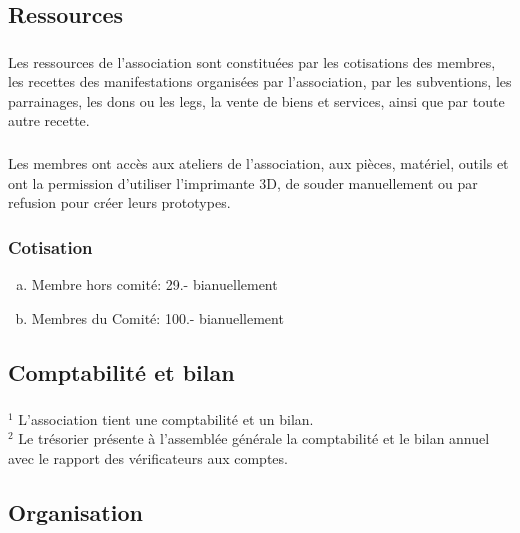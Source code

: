 \documentclass[12pt,a4paper,oneside]{article}
\newcounter{art}
\newcommand{\french}{    \switchcolumn[1]\noindent}
\newcounter{para}
\begin{document}
\begin{paracol}{2}
\newpage 

\french 
	\subsection{Ressources}


\french
	\subsubsection{}
	Les ressources de l’association sont constituées par les cotisations des membres, les recettes des manifestations organisées par l’association, par les subventions, les parrainages, les dons ou les legs, la vente de biens et services, ainsi que par toute autre recette.

\french
	\subsubsection{} 
	Les membres ont accès aux ateliers de l’association, aux pièces, matériel, outils et ont la permission d’utiliser l’imprimante 3D, de souder manuellement ou par refusion pour créer leurs prototypes.


\french
	\subsubsection{Cotisation}
	\begin{enumerate}[(a)]
	\item Membre hors comité: 29.- bianuellement
	\item Membres du Comité: 100.- bianuellement
	\end{enumerate}


\french 
	\subsection{Comptabilité et bilan}
	\subsubsection{}

	$^1$ L’association tient une comptabilité et un bilan. \\
	$^2$ Le trésorier présente à l’assemblée générale la comptabilité et le bilan annuel avec le rapport des vérificateurs aux comptes. 


\french
	\subsection{Organisation}


\end{paracol}
\end{document}
